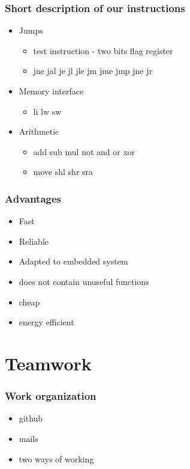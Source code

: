 \documentclass[c]{beamer}
\begin{document}
\begin{frame}
\frametitle{Short description of our instructions}
\begin{itemize}
\item {Jumps
   \begin{itemize}
     \item test instruction - two bits flag register
     \item jne jal je jl jle jm jme jmp jne jr
   \end{itemize}
}
\item {Memory interface
   \begin{itemize}
     \item li lw sw
   \end{itemize}
}
\item {Arithmetic
   \begin{itemize}
     \item add sub mul not and or xor
     \item move shl shr sra
   \end{itemize}
}
\end{itemize}
\end{frame}

\begin{frame}
\frametitle{Advantages}
\begin{itemize}
  \item Fast \pause
  \item Reliable \pause
  \item Adapted to embedded system 
  \item does not contain unuseful functions
  \item cheap
  \item energy efficient

\end{itemize}
\end{frame}

\section{Teamwork}

\begin{frame}
\frametitle{Work organization}
\begin{itemize}
\item github
\item mails
\item two ways of working
\end{itemize} 
\end{frame}
\end{document}
